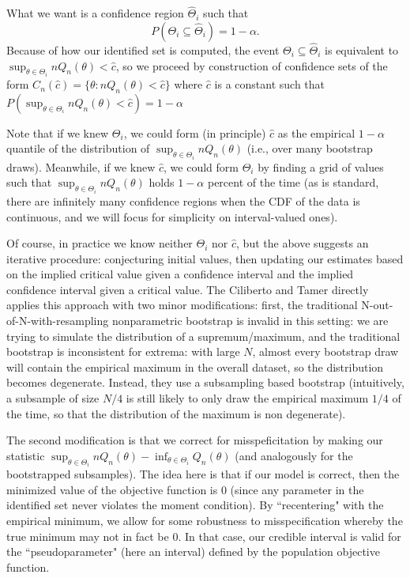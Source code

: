 \documentclass{article}
\begin{document}
\begin{enumerate}
\begin{enumerate}
\begin{answer}
What we want is a confidence region $\hat{\Theta}_i$ such that $$P(\Theta_i\subseteq \hat{\Theta}_i) = 1 - \alpha. $$
Because of how our identified set is computed, the  event $\Theta_i\subseteq \hat{\Theta}_i$ is equivalent to $\sup_{\theta \in \Theta_i}nQ_n(\theta) < \hat{c}$, so we proceed by  construction of confidence sets of the form $C_n(\hat{c}) = \{\theta:nQ_n(\theta)<\hat{c} \}$
where $\hat{c}$ is a constant such that 
$P(\sup_{\theta \in \Theta_i}nQ_n(\theta) < \hat{c}) = 1- \alpha $

Note that if we knew $\Theta_{i}$, we could form (in principle) $\hat{c}$ as the empirical $1-\alpha$ quantile of the distribution of $\sup_{\theta \in \Theta_i}  nQ_n(\theta)$ (i.e., over many bootstrap draws). Meanwhile, if we knew $\hat{c}$, we could form $\Theta_i$ by finding a grid of values such that $\sup_{\theta \in \Theta_i}  nQ_n(\theta)$ holds $1-\alpha$ percent of the time (as is standard, there are infinitely many confidence regions when the CDF of the data is continuous, and we will focus for simplicity on interval-valued ones). 

Of course, in practice we know neither $\Theta_{i}$ nor $\hat{c}$, but the above suggests an iterative procedure: conjecturing initial values, then updating our estimates based on the implied critical value given a confidence interval and the implied confidence interval given a critical value. The Ciliberto and Tamer directly applies this approach with two minor modifications: first, the traditional N-out-of-N-with-resampling nonparametric bootstrap is invalid in this setting: we are trying to simulate the distribution of a supremum/maximum, and the traditional bootstrap is inconsistent for extrema: with large $N$, almost every bootstrap draw will contain the empirical maximum in the overall dataset, so the distribution becomes degenerate. Instead, they use a subsampling based bootstrap (intuitively, a subsample of size $N/4$ is still likely to only draw the empirical maximum $1/4$ of the time, so that the distribution of the maximum is non degenerate). 

The second modification is that we correct for misspeficitation by making our statistic $\sup_{\theta \in \Theta_i} nQ_n(\theta) - \inf_{\theta \in \Theta_i}Q_n(\theta)$ (and analogously for the bootstrapped subsamples). The idea here is that if our model is correct, then the minimized value of the objective function is 0 (since any parameter in the identified set never violates the moment condition). By ``recentering" with the empirical minimum, we allow for some robustness to misspecification whereby the true minimum may not in fact be 0. In that case, our credible interval is valid for the ``pseudoparameter" (here an interval) defined by the population objective function. 


\end{answer}
\end{enumerate}
\end{enumerate}
\end{document}
